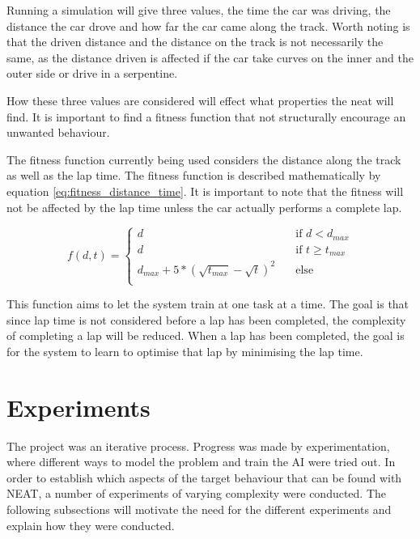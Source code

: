 Running a simulation will give three values, the time the car was driving, the distance the car drove and how far the car came along the track. Worth noting is that the driven distance and the distance on the track is not necessarily the same, as the distance driven is affected if the car take curves on the inner and the outer side or drive in a serpentine.

How these three values are considered will effect what properties the neat will find. It is important to find a fitness function that not structurally encourage an unwanted behaviour.

The fitness function currently being used considers the distance along the track as well as the lap time. The fitness function is described mathematically by equation \ref{eq:fitness_distance_time}. It is important to note that the fitness will not be affected by the lap time unless the car actually performs a complete lap.

\begin{equation}
\label{eq:fitness_distance_time}
  f(d, t) =
  \begin{cases}
    d    & \quad \text{if } d < d_{max} \\
    d    & \quad \text{if } t \geq t_{max} \\
    d_{max} + 5*(\sqrt{t_{max}} - \sqrt{t})^2    &\quad \text{else} \\
  \end{cases}
\end{equation}

\noindent
This function aims to let the system train at one task at a time. The goal is that since lap time is not considered before a lap has been completed, the complexity of completing a lap will be reduced. When a lap has been completed, the goal is for the system to learn to optimise that lap by minimising the lap time. 






\section{Experiments}

The project was an iterative process. Progress was made by experimentation, where different ways to model the problem and train the AI were tried out. In order to establish which aspects of the target behaviour that can be found with NEAT, a number of experiments of varying complexity were conducted. The following subsections will motivate the need for the different experiments and explain how they were conducted. 

